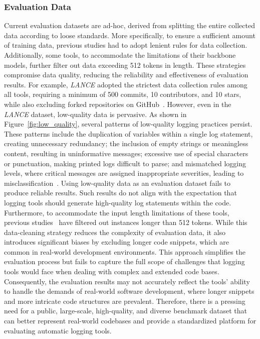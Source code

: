 \subsubsection{Evaluation Data}
\label{sec:moti:dataset}
Current evaluation datasets are ad-hoc, derived from splitting the entire collected data according to loose standards. More specifically, to ensure a sufficient amount of training data, previous studies had to adopt lenient rules for data collection. Additionally, some tools, to accommodate the limitations of their backbone models, further filter out data exceeding 512 tokens in length.
These strategies compromise data quality, reducing the reliability and effectiveness of evaluation results.
For example, \textit{LANCE} adopted the strictest data collection rules among all tools, requiring a minimum of 500 commits, 10 contributors, and 10 stars, while also excluding forked repositories on GitHub~\cite{GitHub}. However, even in the \textit{LANCE} dataset, low-quality data is pervasive. As shown in Figure~\ref{fig:low_quality}, several patterns of low-quality logging practices persist. These patterns include the duplication of variables within a single log statement, creating unnecessary redundancy; the inclusion of empty strings or meaningless content, resulting in uninformative messages; excessive use of special characters or punctuation, making printed logs difficult to parse; and mismatched logging levels, where critical messages are assigned inappropriate severities, leading to misclassification~\cite{gojko2006logging, Chen2017CharacterizingAD}.
Using low-quality data as an evaluation dataset fails to produce reliable results. Such results do not align with the expectation that logging tools should generate high-quality log statements within the code.
Furthermore, to accommodate the input length limitations of these tools,  previous studies~\cite{Mastropaolo2022UsingDL, Mastropaolo2023LogSG, Xu2024UniLogAL, xie2024fastlog} have filtered out instances longer than 512 tokens. While this data-cleaning strategy reduces the complexity of evaluation data, it also introduces significant biases by excluding longer code snippets, which are common in real-world development environments. This approach simplifies the evaluation process but fails to capture the full scope of challenges that logging tools would face when dealing with complex and extended code bases. Consequently, the evaluation results may not accurately reflect the tools’ ability to handle the demands of real-world software development, where longer snippets and more intricate code structures are prevalent. Therefore, there is a pressing need for a public, large-scale, high-quality, and diverse benchmark dataset that can better represent real-world codebases and provide a standardized platform for evaluating automatic logging tools. 

